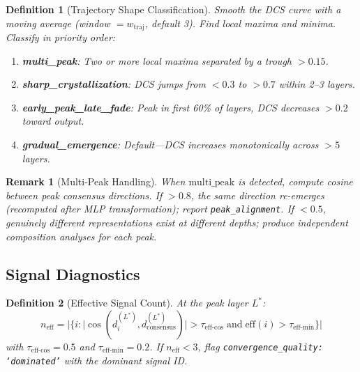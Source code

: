 \documentclass[11pt]{article}
\newtheorem{definition}{Definition}[section]
\newtheorem{remark}{Remark}[section]
\begin{document}
\begin{definition}[Trajectory Shape Classification]
\label{def:trajectory-shape}
Smooth the DCS curve with a moving average (window $= w_{\text{traj}}$, default 3). Find local maxima and minima. Classify in priority order:
\begin{enumerate}[nosep]
\item \textbf{multi\_peak}: Two or more local maxima separated by a trough $> 0.15$.
\item \textbf{sharp\_crystallization}: DCS jumps from $< 0.3$ to $> 0.7$ within 2--3 layers.
\item \textbf{early\_peak\_late\_fade}: Peak in first 60\% of layers, DCS decreases $> 0.2$ toward output.
\item \textbf{gradual\_emergence}: Default---DCS increases monotonically across $> 5$ layers.
\end{enumerate}
\end{definition}

\begin{remark}[Multi-Peak Handling]
When $\text{multi\_peak}$ is detected, compute cosine between peak consensus directions. If $> 0.8$, the same direction re-emerges (recomputed after MLP transformation); report \texttt{peak\_alignment}. If $< 0.5$, genuinely different representations exist at different depths; produce independent composition analyses for each peak.
\end{remark}

\subsection{Signal Diagnostics}
\label{app:signal-diagnostics}

\begin{definition}[Effective Signal Count]
\label{def:effective-signal-count}
At the peak layer $L^*$:
\begin{equation}
n_{\text{eff}} = |\{i : |\cos(d^{(L^*)}_i, d^{(L^*)}_{\text{consensus}})| > \tau_{\text{eff-cos}} \;\text{and}\; \text{eff}(i) > \tau_{\text{eff-min}}\}|
\end{equation}
with $\tau_{\text{eff-cos}} = 0.5$ and $\tau_{\text{eff-min}} = 0.2$. If $n_{\text{eff}} < 3$, flag \texttt{convergence\_quality: `dominated'} with the dominant signal ID.
\end{definition}
\end{document}

